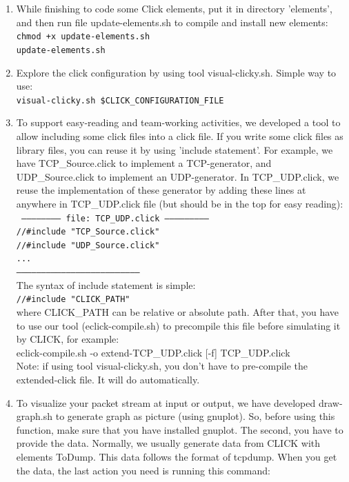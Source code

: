 \documentclass[a4paper]{article}
\begin{document}
\begin{enumerate}
        \item 
          While finishing to code some Click elements, put it in directory 'elements', and then run file update-elements.sh to compile and install new elements: \\
    \texttt{chmod +x update-elements.sh\\
    update-elements.sh}
        \item
        Explore the click configuration by using tool visual-clicky.sh. Simple way to use: \\    
    \texttt{visual-clicky.sh \$CLICK\_CONFIGURATION\_FILE}
        \item
        To support easy-reading and team-working activities, we developed a tool to allow including some click files into a click file. If you write some click files as library files, you can reuse it by using 'include statement'. For example, we have TCP\_Source.click to implement a TCP-generator, and UDP\_Source.click to implement an UDP-generator. In TCP\_UDP.click, we reuse the implementation of these generator by adding these lines at anywhere in TCP\_UDP.click file (but should be in the top for easy reading): \\
        \texttt{
  ------------------------ file: TCP\_UDP.click ---------------------------\\
  //#include "TCP\_Source.click"\\
  //#include "UDP\_Source.click"\\
  ...\\
  --------------------------------------------------------------------------}\\
  The syntax of include statement is simple:\\
          \texttt{//#include "CLICK\_PATH"}\\
  where CLICK\_PATH can be relative or absolute path. After that, you have to use our tool (eclick-compile.sh) to precompile this file before simulating it by CLICK, for example:\\
    eclick-compile.sh -o extend-TCP\_UDP.click [-f] TCP\_UDP.click\\
Note: if using tool visual-clicky.sh, you don't have to pre-compile the extended-click file. It will do automatically.
        \item
        \begin{flushleft}
        To visualize your packet stream at input or output, we have developed draw-graph.sh to generate graph as picture (using gnuplot). So, before using this function, make sure that you have installed gnuplot. The second, you have to provide the data. Normally, we usually generate data from CLICK with elements ToDump. This data follows the format of tcpdump. When you get the data, the last action you need is running this command:\\

\end{flushleft}
\end{enumerate}
\end{document}
